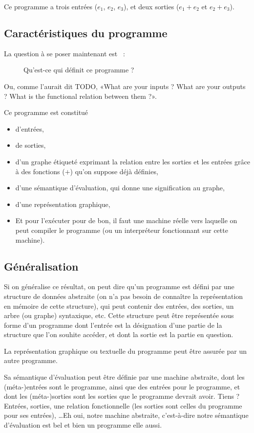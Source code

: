 \documentclass{article}
\begin{document}
Ce programme a trois entrées ($e_1$, $e_2$, $e_3$), et deux sorties ($e_1+e_2$ et $e_2+e_3$).

\subsection{Caractéristiques du programme}
La question à se poser maintenant est ~:
\begin{figure}[h!]
  \centering
  Qu'est-ce qui définit ce programme ?
\end{figure}

Ou, comme l'aurait dit TODO, «What are your inputs ? What are your outputs ? What is the functional relation between them ?».

Ce programme est constitué
\begin{itemize}
\item d'entrées,
\item de sorties,
\item d'un graphe étiqueté exprimant la relation entre les sorties et les entrées grâce à des fonctions ($+$) qu'on suppose déjà définies,
\item d'une sémantique d'évaluation, qui donne une signification au graphe,
\item d'une représentation graphique,
\item Et pour l'exécuter pour de bon, il faut une machine réelle vers laquelle on peut compiler le programme (ou un interpréteur fonctionnant sur cette machine).
\end{itemize}

\subsection{Généralisation}
Si on généralise ce résultat, on peut dire qu'un programme est défini par une structure de données abstraite (on n'a pas besoin de connaître la représentation en mémoire de cette structure), qui peut contenir des entrées, des sorties, un arbre (ou graphe) syntaxique, etc. Cette structure peut être représentée sous forme d'un programme dont l'entrée est la désignation d'une partie de la structure que l'on souhite accéder, et dont la sortie est la partie en question.

La représentation graphique ou textuelle du programme peut être assurée par un autre programme.

Sa sémantique d'évaluation peut être définie par une machine abstraite, dont les (méta-)entrées sont le programme, ainsi que des entrées pour le programme, et dont les (méta-)sorties sont les sorties que le programme devrait avoir. Tiens ? Entrées, sorties, une relation fonctionnelle (les sorties sont celles du programme pour ses entrées), \dots Eh oui, notre machine abstraite, c'est-à-dire notre sémantique d'évaluation est bel et bien un programme elle aussi.
\end{document}
